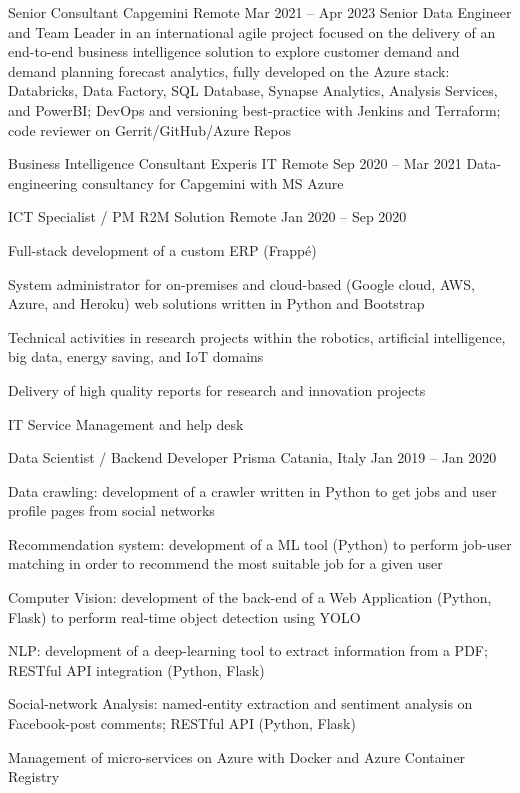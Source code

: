 \begin{cventries}
    \cventry
    {Senior Consultant}
    {Capgemini}
    {Remote}
    {Mar 2021 -- Apr 2023}
    {Senior Data Engineer and Team Leader in an international agile project focused on the delivery of an end-to-end business intelligence solution to explore customer demand and demand planning forecast analytics, fully developed on the Azure stack: Databricks, Data Factory, SQL Database, Synapse Analytics, Analysis Services, and PowerBI; DevOps and versioning best-practice with Jenkins and Terraform; code reviewer on Gerrit/GitHub/Azure Repos}

    \cventry
    {Business Intelligence Consultant}
    {Experis IT}
    {Remote}
    {Sep 2020 -- Mar 2021}
    {Data-engineering consultancy for Capgemini with MS Azure}

    \cventry
    {ICT Specialist / PM}
    {R2M Solution}
    {Remote}
    {Jan 2020 -- Sep 2020}
    {
      \begin{cvitems}
        \item {Full-stack development of a custom ERP (Frappé)}
        \item {System administrator for on-premises and cloud-based (Google cloud, AWS, Azure, and Heroku) web solutions written in Python and Bootstrap}
        \item {Technical activities in research projects within the robotics, artificial intelligence, big data, energy saving, and IoT domains}
        \item {Delivery of high quality reports for research and innovation projects}
        \item {IT Service Management and help desk}
      \end{cvitems}
    }


    \cventry
    {Data Scientist / Backend Developer}
    {Prisma}
    {Catania, Italy}
    {Jan 2019 -- Jan 2020}
    {
      \begin{cvitems}
        \item {Data crawling: development of a crawler written in Python to get jobs and user profile pages from social networks}
        \item {Recommendation system: development of a ML tool (Python) to perform job-user matching in order to recommend the most suitable job for a given user}
        \item {Computer Vision: development of the back-end of a Web Application (Python, Flask) to perform real-time object detection using YOLO}
        \item {NLP: development of a deep-learning tool to extract information from a PDF; RESTful API integration (Python, Flask)}
        \item {Social-network Analysis: named-entity extraction and sentiment analysis on Facebook-post comments; RESTful API (Python, Flask)}
        \item {Management of micro-services on Azure with Docker and Azure Container Registry}
      \end{cvitems}
    }


\end{cventries}
